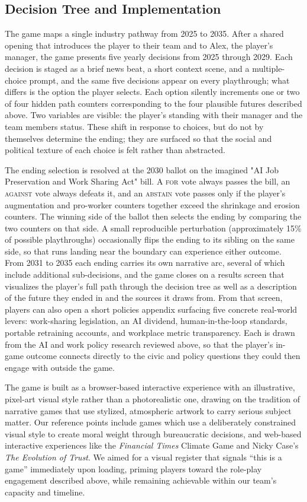 \documentclass[sigconf,authordraft]{acmart}
\begin{document}
\subsection{Decision Tree and Implementation}

The game maps a single industry pathway from 2025 to 2035. After a shared opening that introduces the player to their team and to Alex, the player's manager, the game presents five yearly decisions from 2025 through 2029. Each decision is staged as a brief news beat, a short context scene, and a multiple-choice prompt, and the same five decisions appear on every playthrough; what differs is the option the player selects. Each option silently increments one or two of four hidden path counters corresponding to the four plausible futures described above. Two variables are visible: the player's standing with their manager and the team members status. These shift in response to choices, but do not by themselves determine the ending; they are surfaced so that the social and political texture of each choice is felt rather than abstracted.

The ending selection is resolved at the 2030 ballot on the imagined  "AI Job Preservation and Work Sharing Act" bill. A \textsc{for} vote always passes the bill, an \textsc{against} vote always defeats it, and an \textsc{abstain} vote passes only if the player's augmentation and pro-worker counters together exceed the shrinkage and erosion counters. The winning side of the ballot then selects the ending by comparing the two counters on that side. A small reproducible perturbation (approximately 15\% of possible playthroughs) occasionally flips the ending to its sibling on the same side, so that runs landing near the boundary can experience either outcome. From 2031 to 2035 each ending carries its own narrative arc, several of which include additional sub-decisions, and the game closes on a results screen that visualizes the player's full path through the decision tree as well as a description of the future they ended in and the sources it draws from. From that screen, players can also open a short policies appendix surfacing five concrete real-world levers: work-sharing legislation, an AI dividend, human-in-the-loop standards, portable retraining accounts, and workplace metric transparency. Each is drawn from the AI and work policy research reviewed above, so that the player's in-game outcome connects directly to the civic and policy questions they could then engage with outside the game.

The game is built as a browser-based interactive experience with an illustrative, pixel-art visual style rather than a photorealistic one, drawing on the tradition of narrative games that use stylized, atmospheric artwork to carry serious subject matter. Our reference points include games which use a deliberately constrained visual style to create moral weight through bureaucratic decisions, and web-based interactive experiences like the \textit{Financial Times} Climate Game and Nicky Case's \textit{The Evolution of Trust}. We aimed for a visual register that signals ``this is a game'' immediately upon loading, priming players toward the role-play engagement described above, while remaining achievable within our team's capacity and timeline.
\end{document}
